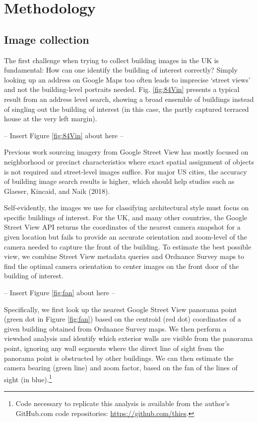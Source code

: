 \documentclass[]{article}
\let\rmarkdownfootnote\footnote%
\def\footnote{\protect\rmarkdownfootnote}
\begin{document}
\hypertarget{methodology}{%
\section{Methodology}\label{methodology}}

\hypertarget{image-collection}{%
\subsection{Image collection}\label{image-collection}}

The first challenge when trying to collect building images in the UK is
fundamental: How can one identify the building of interest correctly?
Simply looking up an address on Google Maps too often leads to imprecise
`street views' and not the building-level portraits needed. Fig.
\ref{fig:84Vin} presents a typical result from an address level search,
showing a broad ensemble of buildings instead of singling out the
building of interest (in this case, the partly captured terraced house
at the very left margin).

\begin{center}
  -- Insert Figure \ref{fig:84Vin} about here --
\end{center}

Previous work sourcing imagery from Google Street View has mostly
focused on neighborhood or precinct characteristics where exact spatial
assignment of objects is not required and street-level images suffice.
For major US cities, the accuracy of building image search results is
higher, which should help studies such as Glaeser, Kincaid, and Naik
(2018).

Self-evidently, the images we use for classifying architectural style
must focus on specific buildings of interest. For the UK, and many other
countries, the Google Street View API returns the coordinates of the
nearest camera snapshot for a given location but fails to provide an
accurate orientation and zoom-level of the camera needed to capture the
front of the building. To estimate the best possible view, we combine
Street View metadata queries and Ordnance Survey maps to find the
optimal camera orientation to center images on the front door of the
building of interest.

\begin{center}
  -- Insert Figure \ref{fig:fan} about here --
\end{center}

Specifically, we first look up the nearest Google Street View panorama
point (green dot in Figure \ref{fig:fan}) based on the centroid (red
dot) coordinates of a given building obtained from Ordnance Survey maps.
We then perform a viewshed analysis and identify which exterior walls
are visible from the panorama point, ignoring any wall segments where
the direct line of sight from the panorama point is obstructed by other
buildings. We can then estimate the camera bearing (green line) and zoom
factor, based on the fan of the lines of sight (in
blue).\footnote{Code necessary to replicate this analysis is available from the author's GitHub.com code repositories: \href{https://github.com/thies}{https://github.com/thies}.}
\end{document}

